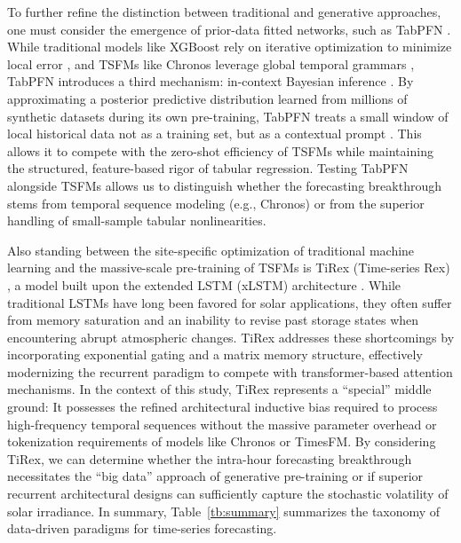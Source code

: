 \documentclass[number, 3p, 10pt, times]{elsarticle}
\begin{document}
To further refine the distinction between traditional and generative approaches, one must consider the emergence of prior-data fitted networks, such as TabPFN \citep{Hollmann2025}. While traditional models like XGBoost rely on iterative optimization to minimize local error \citep{Chen2016}, and TSFMs like Chronos leverage global temporal grammars \citep{Ansari2024}, TabPFN introduces a third mechanism: in-context Bayesian inference \citep{muller2024}. By approximating a posterior predictive distribution learned from millions of synthetic datasets during its own pre-training, TabPFN treats a small window of local historical data not as a training set, but as a contextual prompt \citep{Hollmann2025}. This allows it to compete with the zero-shot efficiency of TSFMs while maintaining the structured, feature-based rigor of tabular regression. Testing TabPFN alongside TSFMs allows us to distinguish whether the forecasting breakthrough stems from temporal sequence modeling (e.g., Chronos) or from the superior handling of small-sample tabular nonlinearities. 

Also standing between the site-specific optimization of traditional machine learning and the massive-scale pre-training of TSFMs is TiRex (Time-series Rex) \citep{Auer2025}, a model built upon the extended LSTM (xLSTM) architecture \citep{Beck2024}. While traditional LSTMs have long been favored for solar applications, they often suffer from memory saturation and an inability to revise past storage states when encountering abrupt atmospheric changes. TiRex addresses these shortcomings by incorporating exponential gating and a matrix memory structure, effectively modernizing the recurrent paradigm to compete with transformer-based attention mechanisms. In the context of this study, TiRex represents a ``special'' middle ground: It possesses the refined architectural inductive bias required to process high-frequency temporal sequences without the massive parameter overhead or tokenization requirements of models like Chronos or TimesFM. By considering TiRex, we can determine whether the intra-hour forecasting breakthrough necessitates the ``big data'' approach of generative pre-training or if superior recurrent architectural designs can sufficiently capture the stochastic volatility of solar irradiance. In summary, Table~\ref{tb:summary} summarizes the taxonomy of data-driven paradigms for time-series forecasting. 
\end{document}
